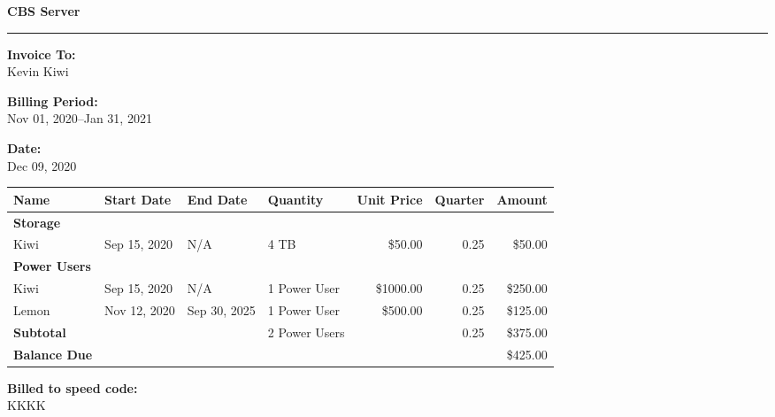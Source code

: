 \documentclass{article}
\begin{document}
\hfill{\huge\bf CBS Server}\hfill
\bigskip
\hrule

{\bf Invoice To:} \\
Kevin Kiwi 

{\bf Billing Period:} \\
Nov 01, 2020--Jan 31, 2021

{\bf Date:} \\
Dec 09, 2020

\begin{table}[htb]
\begin{center}
\begin{tabular}[htb]{l l l l r r r}
\toprule
Name & Start Date & End Date & Quantity & Unit Price & Quarter & Amount\\
\midrule
\bf Storage & & & & & &\\
Kiwi & Sep 15, 2020 & N/A & 4 TB & \$50.00 & 0.25 & \$50.00\\
\bf Power Users\\

Kiwi & Sep 15, 2020 & N/A & 1 Power User & \$1000.00 & 0.25 & \$250.00\\

Lemon & Nov 12, 2020 & Sep 30, 2025 & 1 Power User & \$500.00 & 0.25 & \$125.00\\

\midrule
\bf Subtotal & & & 2 Power Users & & 0.25 & \$375.00\\
\bottomrule
\bf Balance Due & & & & & & \$425.00
\end{tabular}
\end{center}
\end{table}

{\bf Billed to speed code:} \\
KKKK
\end{document}
